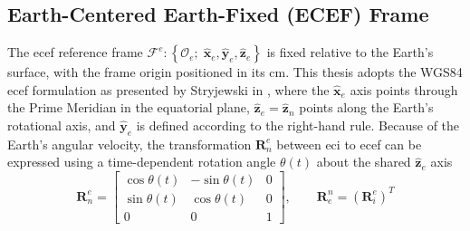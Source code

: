 \subsection{Earth-Centered Earth-Fixed (ECEF) Frame}
The \gls{ecef} reference frame $\mathcal{F}^{e}: \left\{ \mathcal{O}_e; \; \hat{\textbf{x}}_{e}, \hat{\textbf{y}}_{e}, \hat{\textbf{z}}_{e} \right\}$ is fixed relative to the Earth's surface, with the frame origin positioned in its \gls{cm}. This thesis adopts the WGS84 \gls{ecef} formulation as presented by Stryjewski in \cite{Stryjewski2020}, where the $\hat{\textbf{x}}_e$ axis points through the Prime Meridian in the equatorial plane, $\hat{\textbf{z}}_e = \hat{\textbf{z}}_n$ points along the Earth's rotational axis, and $\hat{\textbf{y}}_e$ is defined according to the right-hand rule. Because of the Earth's angular velocity, the transformation $\textbf{R}^e_n$ between \gls{eci} to \gls{ecef} can be expressed using a time-dependent rotation angle $\theta(t)$ about the shared $\hat{\textbf{z}}_e$ axis \cite{hystad2025}
\begin{equation}
    \textbf{R}^e_n = \begin{bmatrix}
        \cos \theta(t) & -\sin \theta(t) &  0 \\
        \sin \theta(t) & \cos \theta(t) & 0 \\
        0 & 0 & 1
    \end{bmatrix}, \qquad \textbf{R}^n_e = (\textbf{R}^e_i)^T
\label{eq:eci2ecef}
\end{equation}

